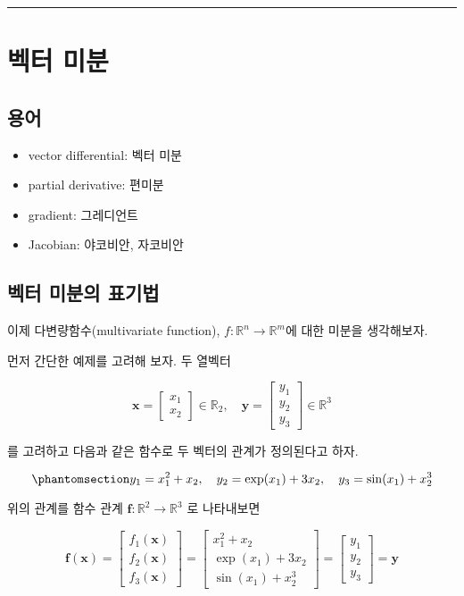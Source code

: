 \documentclass[
  11pt,
  a4paper,
  oneside]{scrbook}
\providecommand{\tightlist}{%
  \setlength{\itemsep}{0pt}\setlength{\parskip}{0pt}}\usepackage{longtable,booktabs,array}
\newcommand{\RR}{\mathbb{R}}
\theoremstyle{definition}
\theoremstyle{plain}
\theoremstyle{definition}
\theoremstyle{definition}
\theoremstyle{remark}
\begin{document}
\begin{center}\rule{0.5\linewidth}{0.5pt}\end{center}

\chapter{벡터 미분}\label{vector-cal-01}

\section{용어}\label{uxc6a9uxc5b4}

\begin{itemize}
\tightlist
\item
  vector differential: 벡터 미분
\item
  partial derivative: 편미분
\item
  gradient: 그레디언트
\item
  Jacobian: 야코비안, 자코비안
\end{itemize}

\section{벡터 미분의
표기법}\label{uxbca1uxd130-uxbbf8uxbd84uxc758-uxd45cuxae30uxbc95}

이제 다변량함수(multivariate function), \(f: \RR^n \rightarrow \RR^m\)에
대한 미분을 생각해보자.

먼저 간단한 예제를 고려해 보자. 두 열벡터

\[
\pmb x=
\begin{bmatrix}
x_1 \\ 
x_2
\end{bmatrix}
\in \RR_2, \quad 
\pmb y=
\begin{bmatrix}
y_1 \\
y_2 \\ 
y_3 
\end{bmatrix} \in \RR^3
\]

를 고려하고 다음과 같은 함수로 두 벡터의 관계가 정의된다고 하자.

\begin{equation}\phantomsection\label{eq-vec-cal-xy}{ 
y_1 = x_1^2 + x_2, \quad y_2= \exp (x_1) + 3 x_2, \quad y_3 = \sin(x_1) + x_2^3 
}\end{equation}

위의 관계를 함수 관계 \(\pmb f: \RR^2 \rightarrow \RR^3\) 로 나타내보면

\[ 
 \pmb f(\pmb x) = 
\begin{bmatrix} f_1(\pmb x) \\ f_2 (\pmb x) \\ f_3(\pmb x) \end{bmatrix} = 
\begin{bmatrix} x_1^2 + x_2 \\ \exp (x_1) + 3 x_2 \\ \sin(x_1) + x_2^3 \end{bmatrix} =
\begin{bmatrix} y_1 \\ y_2 \\ y_3 \end{bmatrix} = \pmb y
\]
\end{document}
